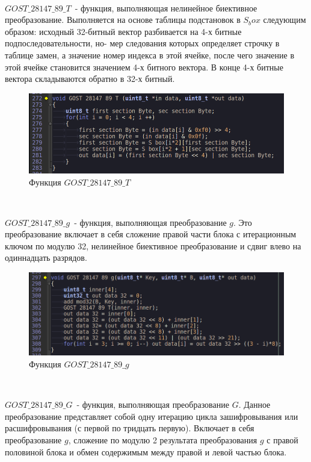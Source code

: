 \documentclass[oneside,final,14pt]{extreport}
\begin{document}
~\



$GOST\_28147\_89\_T$~- функция, выполняющая нелинейное биективное преобразование. Выполняется на основе таблицы подстановок в $S_box$ следующим образом: исходный
32-битный вектор разбивается на 4-х битные подпоследовательности, но- мер следования которых определяет строчку в таблице замен, а значение
номер индекса в этой ячейке, после чего значение в этой ячейке становится
значением 4-х битного вектора. В конце 4-х битные вектора складываются
обратно в 32-х битный. 


\begin{figure}[h]
\includegraphics[width=1.1\textwidth]{12.png}
\caption{Функция $GOST\_28147\_89\_T$}
\end{figure}




~\



$GOST\_28147\_89\_g$~- функция, выполняющая преобразование $g$. Это преобразование включает
в себя сложение правой части блока с итерационным ключом по модулю
32, нелинейное биективное преобразование и сдвиг влево на одиннадцать
разрядов.


\begin{figure}[h!]
\includegraphics[width=1\textwidth]{13.png}
\caption{Функция $GOST\_28147\_89\_g$}
\end{figure}





~\



$GOST\_28147\_89\_G$~- функция, выполняющая преобразование $G$. Данное преобразование представляет собой одну итерацию цикла зашифровывания или расшифровывания
(с первой по тридцать первую). Включает в себя преобразование $g$,
сложение по модулю 2 результата преобразования $g$ с правой половиной блока и
обмен содержимым между правой и левой частью блока.\\
\end{document}
